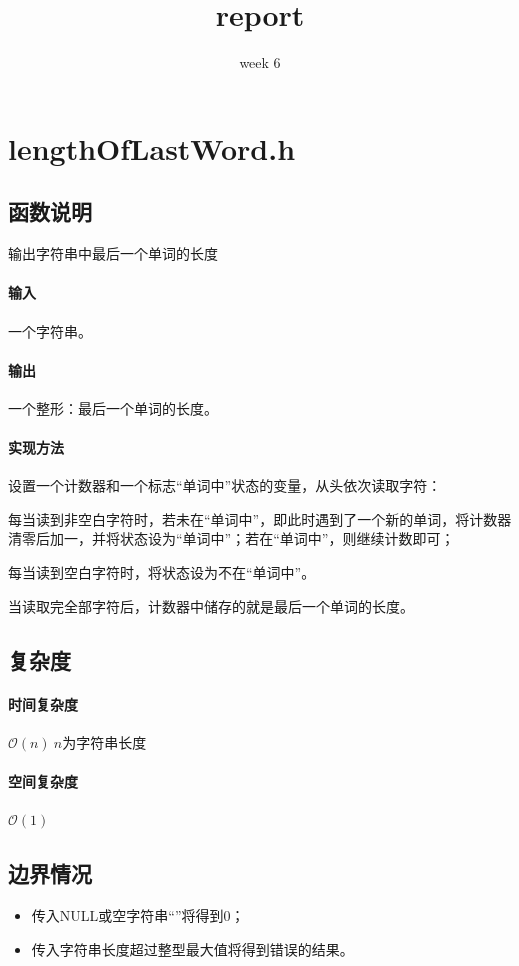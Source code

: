 \documentclass{homework}
\title{report}
\subtitle{week 6}
\begin{document}
\maketitle
\section{lengthOfLastWord.h}
\subsection{函数说明}
输出字符串中最后一个单词的长度
\paragraph{输入}
一个字符串。
\paragraph{输出}
一个整形：最后一个单词的长度。
\paragraph{实现方法}
设置一个计数器和一个标志“单词中”状态的变量，从头依次读取字符：

每当读到非空白字符时，若未在“单词中”，即此时遇到了一个新的单词，将计数器清零后加一，并将状态设为“单词中”；若在“单词中”，则继续计数即可；

每当读到空白字符时，将状态设为不在“单词中”。

当读取完全部字符后，计数器中储存的就是最后一个单词的长度。
\subsection{复杂度}
\paragraph{时间复杂度}
$\mathcal{O}(n) ~ n$为字符串长度
\paragraph{空间复杂度}
$\mathcal{O}(1)$
\subsection{边界情况}
\begin{itemize}
    \item 传入NULL或空字符串“”将得到0；
    \item 传入字符串长度超过整型最大值将得到错误的结果。
\end{itemize}
\end{document}
